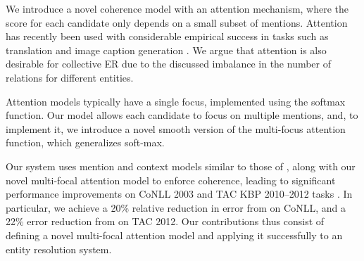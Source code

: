 


We introduce a novel coherence model with an attention mechanism, where the 
score for each candidate only depends on a small subset of mentions.
 Attention has recently been
used with considerable empirical success in tasks such as translation
\cite{bahdanau2014neural} and image caption generation
\cite{xu2015show}. We argue that attention is also desirable for
collective ER due to the discussed imbalance in the number of
relations for different entities.

Attention models typically have a single focus, implemented using the
 softmax function. Our model allows each candidate to
 focus on multiple mentions, and, to implement it, we introduce a 
 novel smooth version of the
 multi-focus attention function, which generalizes soft-max.

Our system uses mention and context models similar to those of 
, along with our novel 
multi-focal attention model to 
enforce coherence, leading to significant performance improvements
on CoNLL 2003 \cite{Hoffart2011} and TAC KBP 2010--2012 tasks \cite{TAC2010,TAC2011,TAC2012}.
In particular, we achieve a 20\% relative reduction
in error from  on CoNLL, and a 
22\% error reduction from  on TAC 2012.
Our contributions thus consist of defining a novel multi-focal
attention model and applying it
successfully to an entity resolution system.



